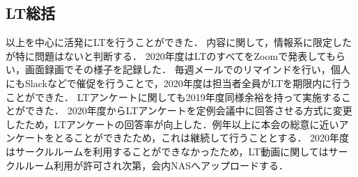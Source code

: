 \subsection*{LT総括}


\secondGrade{}以上を中心に活発にLTを行うことができた．
内容に関して，情報系に限定したが特に問題はないと判断する．
2020年度はLTのすべてをZoomで発表してもらい，画面録画でその様子を記録した．
毎週メールでのリマインドを行い，個人にもSlackなどで催促を行うことで，2020年度は担当者全員がLTを期限内に行うことができた．
LTアンケートに関しても2019年度同様余裕を持って実施することができた．
2020年度からLTアンケートを定例会議中に回答させる方式に変更したため，LTアンケートの回答率が向上した．例年以上に本会の総意に近いアンケートをとることができたため，これは継続して行うこととする．
2020年度はサークルルームを利用することができなかったため，LT動画に関してはサークルルーム利用が許可され次第，会内NASへアップロードする．
